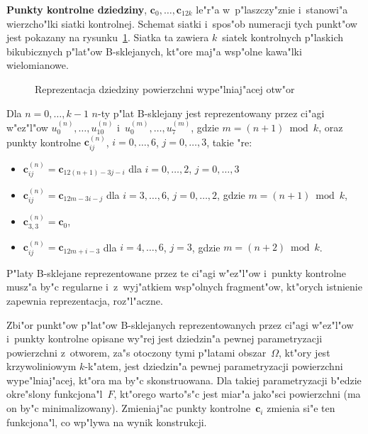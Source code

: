 \textbf{Punkty kontrolne dziedziny}, $\bm{c}_0,\ldots,\bm{c}_{12k}$ le"r"a
w~p"laszczy"znie i~stanowi"a wierzcho"lki
siatki kontrolnej. Schemat siatki i~spos"ob numeracji tych punkt"ow jest
pokazany na rysunku~\ref{fig:domain:cnet}. Siatka ta zawiera $k$~siatek
kontrolnych p"laskich bikubicznych p"lat"ow B-sklejanych, kt"ore maj"a
wsp"olne kawa"lki wielomianowe.%
\begin{figure}[ht]
  \centerline{}
  \caption{\label{fig:domain:cnet}Reprezentacja dziedziny powierzchni
    wype"lniaj"acej otw"or}
\end{figure}

Dla $n=0,\ldots,k-1$ $n$-ty p"lat B-sklejany jest reprezentowany przez
ci"agi w"ez"l"ow $u^{(n)}_0,\ldots,u^{(n)}_{10}$ i~$u^{(m)}_0,\ldots,u^{(m)}_7$,
gdzie $m=(n+1)\bmod k$, oraz punkty kontrolne $\bm{c}^{(n)}_{ij}$, $i=0,\ldots,6$,
$j=0,\ldots,3$, takie "re:
\begin{itemize}
  \item $\bm{c}^{(n)}_{ij}=\bm{c}_{12(n+1)-3j-i}$ dla $i=0,\ldots,2$, $j=0,\ldots,3$
  \item $\bm{c}^{(n)}_{ij}=\bm{c}_{12m-3i-j}$ dla $i=3,\ldots,6$, $j=0,\ldots,2$,
    gdzie $m=(n+1)\bmod k$,
  \item $\bm{c}^{(n)}_{3,3}=\bm{c}_0$,
  \item $\bm{c}^{(n)}_{ij}=\bm{c}_{12m+i-3}$ dla $i=4,\ldots,6$, $j=3$,
    gdzie $m=(n+2)\bmod k$. 
\end{itemize}
P"laty B-sklejane reprezentowane przez te ci"agi w"ez"l"ow i~punkty
kontrolne musz"a by"c regularne i~z~wyj"atkiem wsp"olnych fragment"ow,
kt"orych istnienie zapewnia reprezentacja, roz"l"aczne.

\begin{sloppypar}
Zbi"or punkt"ow p"lat"ow B-sklejanych reprezentowanych przez ci"agi w"ez"l"ow
i~punk\-ty kontrolne opisane wy"rej jest dziedzin"a pewnej parametryzacji
powierzchni z~otworem, za"s otoczony tymi p"latami obszar~$\varOmega$, kt"ory
jest krzywoliniowym $k$-k"atem, jest dziedzin"a pewnej parametryzacji
powierzchni wype"lniaj"acej, kt"ora ma by"c skonstruowana. Dla takiej
parametryzacji b"edzie okre"slony funkcjona"l~$F$, kt"orego warto"s"c
jest miar"a jako"sci powierzchni (ma on by"c minimalizowany).
Zmieniaj"ac punkty kontrolne~$\bm{c}_i$ zmienia si"e ten funkcjona"l,
co wp"lywa na wynik konstrukcji.%
\end{sloppypar}

